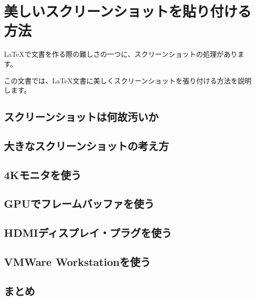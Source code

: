 \chapter{美しいスクリーンショットを貼り付ける方法}
\label{chap:screenshot}

\LaTeX で文書を作る際の難しさの一つに、スクリーンショットの処理があります。

この文書では、\LaTeX 文書に美しくスクリーンショットを張り付ける方法を説明します。

\section{スクリーンショットは何故汚いか}


\section{大きなスクリーンショットの考え方}
\section{4Kモニタを使う}
\section{GPUでフレームバッファを使う}
\section{HDMIディスプレイ・プラグを使う}
\section{VMWare Workstationを使う}
\section{まとめ}